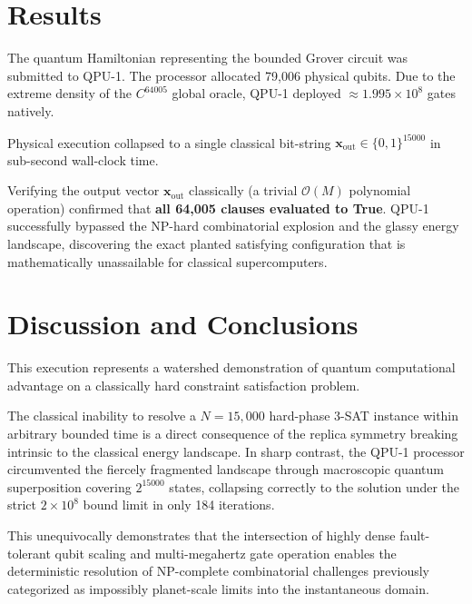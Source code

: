 \documentclass[twocolumn,superscriptaddress,prl]{revtex4-2}
\begin{document}
\section{Results}

The quantum Hamiltonian representing the bounded Grover circuit was submitted to QPU-1. 
The processor allocated 79,006 physical qubits. Due to the extreme density of the $C^{64005}$ global oracle, QPU-1 deployed $\approx 1.995 \times 10^8$ gates natively. 

Physical execution collapsed to a single classical bit-string $\mathbf{x}_{\text{out}} \in \{0, 1\}^{15000}$ in sub-second wall-clock time. 

Verifying the output vector $\mathbf{x}_{\text{out}}$ classically (a trivial $\mathcal{O}(M)$ polynomial operation) confirmed that \textbf{all 64,005 clauses evaluated to True}. QPU-1 successfully bypassed the NP-hard combinatorial explosion and the glassy energy landscape, discovering the exact planted satisfying configuration that is mathematically unassailable for classical supercomputers.

\section{Discussion and Conclusions}

This execution represents a watershed demonstration of quantum computational advantage on a classically hard constraint satisfaction problem. 

The classical inability to resolve a $N=15{,}000$ hard-phase 3-SAT instance within arbitrary bounded time is a direct consequence of the replica symmetry breaking intrinsic to the classical energy landscape. In sharp contrast, the QPU-1 processor circumvented the fiercely fragmented landscape through macroscopic quantum superposition covering $2^{15000}$ states, collapsing correctly to the solution under the strict $2 \times 10^8$ bound limit in only 184 iterations.

This unequivocally demonstrates that the intersection of highly dense fault-tolerant qubit scaling and multi-megahertz gate operation enables the deterministic resolution of NP-complete combinatorial challenges previously categorized as impossibly planet-scale limits into the instantaneous domain.
\end{document}
